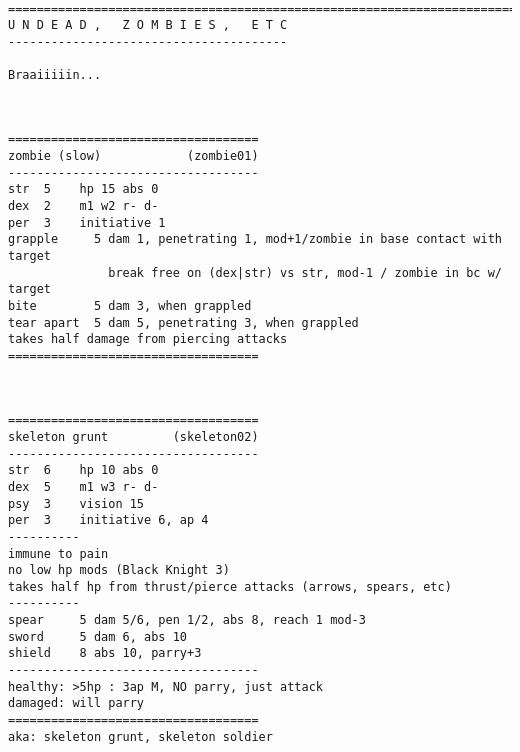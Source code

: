 \








\clearpage
{}


\goodbreak \begin{samepage} \small \begin{verbatim}
================================================================================
U N D E A D ,   Z O M B I E S ,   E T C
---------------------------------------

Braaiiiiin...
\end{verbatim} \normalsize \end{samepage}

\

\goodbreak \begin{samepage} \small \begin{verbatim}
===================================
zombie (slow)            (zombie01)
-----------------------------------
str  5    hp 15 abs 0
dex  2    m1 w2 r- d-
per  3    initiative 1
grapple     5 dam 1, penetrating 1, mod+1/zombie in base contact with target
              break free on (dex|str) vs str, mod-1 / zombie in bc w/ target
bite        5 dam 3, when grappled
tear apart  5 dam 5, penetrating 3, when grappled
takes half damage from piercing attacks
===================================
\end{verbatim} \normalsize \end{samepage}

\

\goodbreak \begin{samepage} \small \begin{verbatim}
===================================
skeleton grunt         (skeleton02)
-----------------------------------
str  6    hp 10 abs 0
dex  5    m1 w3 r- d-
psy  3    vision 15
per  3    initiative 6, ap 4
----------
immune to pain
no low hp mods (Black Knight 3)
takes half hp from thrust/pierce attacks (arrows, spears, etc)
----------
spear     5 dam 5/6, pen 1/2, abs 8, reach 1 mod-3
sword     5 dam 6, abs 10
shield    8 abs 10, parry+3
-----------------------------------
healthy: >5hp : 3ap M, NO parry, just attack
damaged: will parry
===================================
aka: skeleton grunt, skeleton soldier
\end{verbatim} \normalsize \end{samepage}

